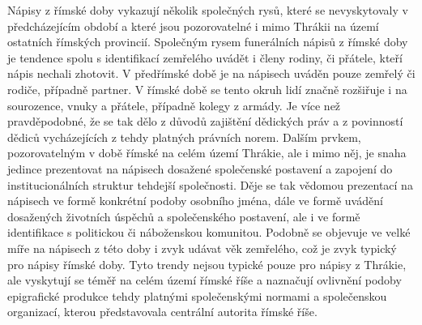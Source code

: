 Nápisy z římské doby vykazují několik společných rysů, které se nevyskytovaly v předcházejícím období a které jsou pozorovatelné i mimo Thrákii na území ostatních římských provincií. Společným rysem funerálních nápisů z římské doby je tendence spolu s identifikací zemřelého uvádět i členy rodiny, či přátele, kteří nápis nechali zhotovit. V předřímské době je na nápisech uváděn pouze zemřelý či rodiče, případně partner. V římské době se tento okruh lidí značně rozšiřuje i na sourozence, vnuky a přátele, případně kolegy z armády. Je více než pravděpodobné, že se tak dělo z důvodů zajištění dědických práv a z povinností dědiců vycházejících z tehdy platných právních norem. Dalším prvkem, pozorovatelným v době římské na celém území Thrákie, ale i mimo něj, je snaha jedince prezentovat na nápisech dosažené společenské postavení a zapojení do institucionálních struktur tehdejší společnosti. Děje se tak vědomou prezentací na nápisech ve formě konkrétní podoby osobního jména, dále ve formě uvádění dosažených životních úspěchů a společenského postavení, ale i ve formě identifikace s politickou či náboženskou komunitou. Podobně se objevuje ve velké míře na nápisech z této doby i zvyk udávat věk zemřelého, což je zvyk typický pro nápisy římské doby. Tyto trendy nejsou typické pouze pro nápisy z Thrákie, ale vyskytují se téměř na celém území římské říše a naznačují ovlivnění podoby epigrafické produkce tehdy platnými společenskými normami a společenskou organizací, kterou představovala centrální autorita římské říše.


